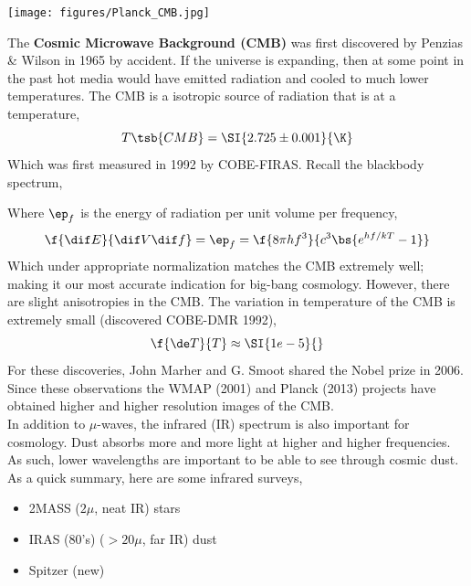 \documentclass{article}
\begin{document}
\begin{center}
    \texttt{[image: figures/Planck\_CMB.jpg]}
\end{center}

The \textbf{Cosmic Microwave Background (CMB)} was first discovered by Penzias \& Wilson in 1965 by accident. If the universe is expanding, then at some point in the past hot media would have emitted radiation and cooled to much lower temperatures. The CMB is a isotropic source of radiation that is at a temperature,
\[ T\tsb{CMB} = \SI{2.725 \pm 0.001}{\K} \]
Which was first measured in 1992 by COBE-FIRAS. Recall the blackbody spectrum,


\begin{center}
\end{center}

Where $\ep_f$ is the energy of radiation per unit volume per frequency,
\[ \f{\dif E}{ \dif V \dif f} = \ep_f = \f{8\pi h f^3}{c^3\bs{e^{hf/kT} - 1}} \]
Which under appropriate normalization matches the CMB extremely well; making it our most accurate indication for big-bang cosmology. However, there are slight anisotropies in the CMB. The variation in temperature of the CMB is extremely small (discovered COBE-DMR 1992),
\[ \f{\de T}{T} \approx \SI{1e-5}{} \]
For these discoveries, John Marher and G. Smoot shared the Nobel prize in 2006. Since these observations the WMAP (2001) and Planck (2013) projects have obtained higher and higher resolution images of the CMB. \\

In addition to $\mu$-waves, the infrared (IR) spectrum is also important for cosmology. Dust absorbs more and more light at higher and higher frequencies. As such, lower wavelengths are important to be able to see through cosmic dust. As a quick summary, here are some infrared surveys,
\begin{itemize}
    \item 2MASS ($2\mu$, neat IR) stars
    \item IRAS (80's) ($>20\mu$, far IR) dust
    \item Spitzer (new)
\end{itemize}
\end{document}
